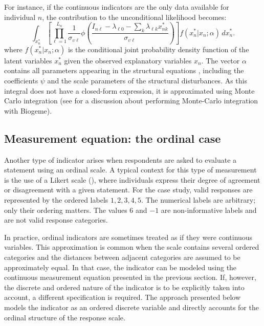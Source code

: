 \documentclass[12pt,a4paper]{article}
\begin{document}
For instance, if the continuous indicators are the only data available
for individual \( n \), the contribution to the unconditional
likelihood becomes:
\begin{equation}
  \label{eq:likelihood_continuous}
  \int_{x_n^*}
  \left[
  \prod_{\ell=1}^{L_n}
  \frac{1}{\sigma_{\upsilon \ell}}
  \phi\left(
  \frac{I_{n\ell}
    - \lambda_{\ell 0}
    - \sum_k \lambda_{\ell k} x_{nk}^*}
  {\sigma_{\upsilon \ell}}
  \right)
  \right]
  f(x_n^*|x_n;\alpha)\,
  dx_n^*.
\end{equation}
where \( f(x_n^*|x_n;\alpha) \) is the conditional joint probability
density function of the latent variables \(x_n^*\) given the observed
explanatory variables \(x_n\). The vector \(\alpha\) contains all
parameters appearing in the structural equations  , including the
coefficients \(\psi\) and the scale parameters of the structural
disturbances.
  As this
integral does not have a closed-form expression, it is approximated
using Monte Carlo integration (see \cite{Bier19} for a discussion
about performing Monte-Carlo integration with Biogeme).




\subsection{Measurement equation: the ordinal case}
\label{sec:likert}

Another type of indicator arises when respondents are asked to
evaluate a statement using an ordinal scale. A typical context for
this type of measurement is the use of a Likert scale
(\cite{likert1932technique}), where individuals express their degree
of agreement or disagreement with a given statement.
For the case study, valid responses are represented by the ordered
labels \(1,2,3,4,5\). The numerical labels are arbitrary; only their
ordering matters. The values \(6\) and \(-1\) are non-informative
labels and are not valid response categories.


In practice, ordinal indicators are sometimes treated as if they were
continuous variables. This approximation is common when the scale
contains several ordered categories and the distances between adjacent
categories are assumed to be approximately equal. In that case, the
indicator can be modeled using the continuous measurement equation
presented in the previous section. If, however, the discrete and
ordered nature of the indicator is to be explicitly taken into
account, a different specification is required. The approach
presented below models the indicator as an ordered discrete variable
and directly accounts for the ordinal structure of the response scale.
\end{document}
